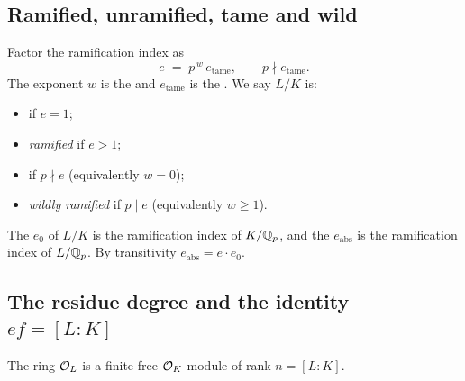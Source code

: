 \subsection{Ramified, unramified, tame and wild}
\label{subsec:tame-wild}

\begin{definition}
\label{def:tame-wild}
\notready
Factor the ramification index as
\[
  e \;=\; p^{\,w}\,e_{\mathrm{tame}}, \qquad p\nmid e_{\mathrm{tame}} .
\]
The exponent $w$ is the
 and
$e_{\mathrm{tame}}$ is the
. We say $L/K$ is:
\begin{itemize}
  \item {} if $e=1$;
  \item \emph{ramified} if $e>1$;
  \item {} if $p\nmid e$
        (equivalently $w=0$);
  \item \emph{wildly ramified} if $p\mid e$ (equivalently $w\ge 1$).
\end{itemize}
\end{definition}

\begin{definition}
\label{def:base-absolute}
\notready
The  $e_0$ of $L/K$
is the ramification index of $K/\mathbb{Q}_p$, and the
$e_{\mathrm{abs}}$ is the ramification index of $L/\mathbb{Q}_p$. By transitivity
$e_{\mathrm{abs}}=e\cdot e_0$.
\end{definition}

\subsection{The residue degree and the identity \texorpdfstring{$ef=[L:K]$}{ef=[L:K]}}
\label{subsec:ef}

\begin{lemma}
\label{lem:OL-free}
\notready
The ring $\mathcal{O}_L$ is a finite free $\mathcal{O}_K$-module of rank $n=[L:K]$.
\end{lemma}

